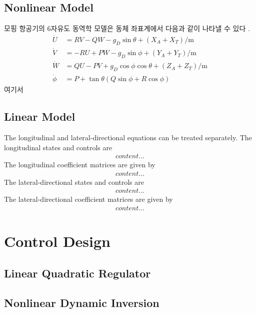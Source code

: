 \documentclass[a4paper, 12pt]{report}
\begin{document}
	\section{Nonlinear Model}
	
	모핑 항공기의 6자유도 동역학 모델은 동체 좌표계에서 다음과 같이 나타낼 수 있다 \cite{stevens2015aircraft}.
	\begin{align}
		\dot{U} &= RV-QW-g_D\sin\theta+(X_A+X_T)/\text{m} \\
		\dot{V} &= -RU+PW-g_D\sin\phi+(Y_A+Y_T)/\text{m} \\
		\dot{W} &= QU-PV+g_D\cos\phi\cos\theta+(Z_A+Z_T)/\text{m} \\
		\dot{\phi} &= P+\tan\theta(Q\sin\phi+R\cos\phi)
	\end{align}
	여기서 
	
	\section{Linear Model}
	
	The longitudinal and lateral-directional equations can be treated separately. The longitudinal states and controls are
	\begin{align}
		content...
	\end{align}
	The longitudinal coefficient matrices are given by
	\begin{align}
		content...
	\end{align}
	The lateral-directional states and controls are
	\begin{align}
		content...
	\end{align}
	The lateral-directional coefficient matrices are given by
	\begin{align}
		content...
	\end{align}

	\chapter{Control Design}
	
	\lipsum[8]
	
	\section{Linear Quadratic Regulator}
	
	\lipsum[9]
	
	\section{Nonlinear Dynamic Inversion}
	
\end{document}
